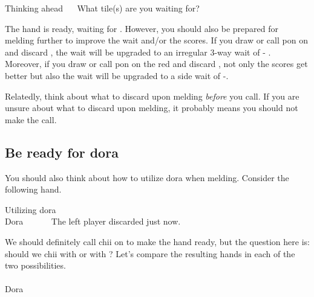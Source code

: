 \bigskip
\begin{itembox}[r]{Thinking ahead}
\bp
{}~~\bai\bai\rbai
\ep
\vspace{-5pt}
What tile(s) are you waiting for?
\end{itembox}

\bigskip
The hand is ready, waiting for {\LARGE{}}. However, you should also be prepared for melding further to improve the wait and/or the scores. 
If you draw or call {\jap pon} on {\LARGE{}} and discard {\LARGE{}}, the wait will be upgraded to an irregular 3-way wait of {\LARGE{}- }. Moreover, if you draw or call {\jap pon} on the red {\LARGE\rfw} and discard {\LARGE{}}, not only the scores get better but also the wait will be upgraded to a side wait of {\LARGE{}-}.

\bigskip
Relatedly, think about what to discard upon melding \emph{before} you call. 
If you are unsure about what to discard upon melding, it probably means you should not make the call. 

\bigskip
\subsection{Be ready for {\jap dora}}
You should also think about how to utilize {\jap dora} when melding. Consider the following hand. 

\bigskip
\begin{itembox}[r]{Utilizing {\jap dora}}
\bp
{}~\fa\rfa\fa~~\\
\hfill\footnotesize{{\jap Dora}~~~~~~}
\ep
\vspace{-15pt}
The left player discarded {\LARGE{}} just now.
\end{itembox}

\bigskip
We should definitely call {\jap chii} on {\LARGE{}} to make the hand ready, but the question here is: should we {\jap chii} with {\LARGE{}} or with {\LARGE{}}? Let's compare the resulting hands in each of the two possibilities. 
\bp
{}~~\fa\rfa\fa~\\
~~\fa\rfa\fa~\\
\hfill\footnotesize{{\jap Dora}~~~~~~~~~}
\ep


